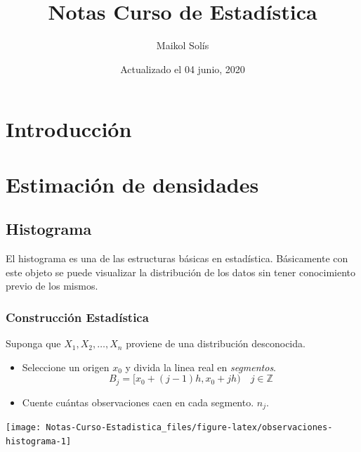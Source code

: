 \documentclass[
  12pt,
]{book}
\title{Notas Curso de Estadística}
\author{Maikol Solís}
\date{Actualizado el 04 junio, 2020}
\theoremstyle{definition}
\theoremstyle{definition}
\theoremstyle{definition}
\theoremstyle{remark}
\begin{document}
\maketitle

{
\hypersetup{linkcolor=}
\setcounter{tocdepth}{4}
\tableofcontents
}
\hypertarget{introducciuxf3n}{%
\chapter{Introducción}\label{introducciuxf3n}}

\hypertarget{estimaciuxf3n-de-densidades}{%
\chapter{Estimación de densidades}\label{estimaciuxf3n-de-densidades}}

\hypertarget{histograma}{%
\section{Histograma}\label{histograma}}

El histograma es una de las estructuras básicas en estadística. Básicamente con este objeto se puede visualizar la distribución de los datos sin tener conocimiento previo de los mismos.

\hypertarget{construcciuxf3n-estaduxedstica}{%
\subsection{Construcción Estadística}\label{construcciuxf3n-estaduxedstica}}

Suponga que \(X_1,X_2, \dots ,X_n\) proviene de una distribución desconocida.

\begin{itemize}
\item
  Seleccione un origen \(x_0\) y divida la linea real en \emph{segmentos}.
  \begin{equation*}
  B_j = [x_0 +(j - 1)h,x_0 + jh) \quad j\in \mathbb{Z}
  \end{equation*}
\item
  Cuente cuántas observaciones caen en cada segmento. \(n_j\).
\end{itemize}

\begin{center}\texttt{[image: Notas-Curso-Estadistica\_files/figure-latex/observaciones-histograma-1]} \end{center}
\end{document}
